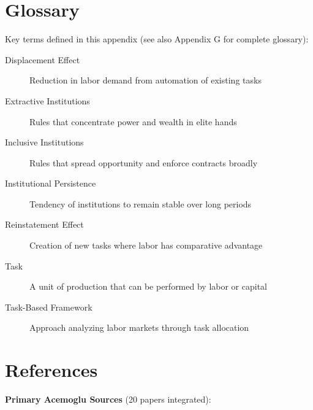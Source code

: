 \section{Glossary}

Key terms defined in this appendix (see also Appendix G for complete glossary):

\begin{description}
    \item[Displacement Effect] Reduction in labor demand from automation of existing tasks
    \item[Extractive Institutions] Rules that concentrate power and wealth in elite hands
    \item[Inclusive Institutions] Rules that spread opportunity and enforce contracts broadly
    \item[Institutional Persistence] Tendency of institutions to remain stable over long periods
    \item[Reinstatement Effect] Creation of new tasks where labor has comparative advantage
    \item[Task] A unit of production that can be performed by labor or capital
    \item[Task-Based Framework] Approach analyzing labor markets through task allocation
\end{description}

\section{References}

\nocite{bcm_master}

\textbf{Primary Acemoglu Sources} (20 papers integrated):

